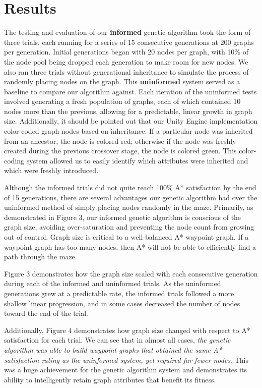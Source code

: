 
\section{Results}

	The testing and evaluation of our \textbf{informed} genetic algorithm took the form of three trials, each running for a series of 15 consecutive generations at 200 graphs per generation. Initial generations began with 20 nodes per graph, with 10\% of the node pool being dropped each generation to make room for new nodes. We also ran three trials without generational inheritance to simulate the process of randomly placing nodes on the graph. This \textbf{uninformed} system served as a baseline to compare our algorithm against. Each iteration of the uninformed tests involved generating a fresh population of graphs, each of which contained 10 nodes more than the previous, allowing for a predictable, linear growth in graph size. Additionally, it should be pointed out that our Unity Engine implementation color-coded graph nodes based on inheritance. If a particular node was inherited from an ancestor, the node is colored red; otherwise if the node was freshly created during the previous crossover stage, the node is colored green. This color-coding system allowed us to easily identify which attributes were inherited and which were freshly introduced.
	
	Although the informed trials did not quite reach 100\% A* satisfaction by the end of 15 generations, there are several advantages our genetic algorithm had over the uninformed method of simply placing nodes randomly in the maze. Primarily, as demonstrated in Figure 3, our informed genetic algorithm is conscious of the graph size, avoiding over-saturation and preventing the node count from growing out of control. Graph size is critical to a well-balanced A* waypoint graph. If a waypoint graph has too many nodes, then A* will not be able to efficiently find a path through the maze.
	
	
	Figure 3 demonstrates how the graph size scaled with each consecutive generation during each of the informed and uninformed trials. As the uninformed generations grew at a predictable rate, the informed trials followed a more shallow linear progression, and in some cases decreased the number of nodes toward the end of the trial.
	
	Additionally, Figure 4 demonstrates how graph size changed with respect to A* satisfaction for each trial. We can see that in almost all cases, \textit{the genetic algorithm was able to build waypoint graphs that obtained the same A* satisfaction rating as the uninformed system, yet required far fewer nodes}. This was a huge achievement for the genetic algorithm system and demonstrates its ability to intelligently retain graph attributes that benefit its fitness.
	